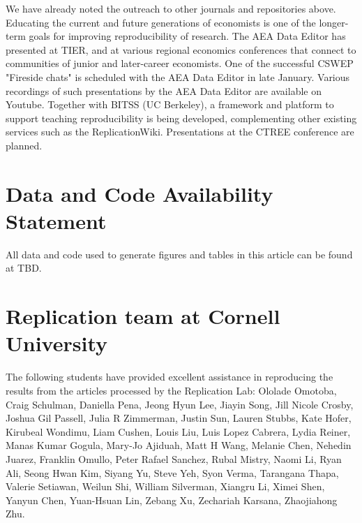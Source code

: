 \documentclass[PP]{AEA}
\begin{document}
We have already noted the outreach to other journals and repositories above. Educating the current and future generations of economists is one of the longer-term goals for improving reproducibility of research. The AEA Data Editor has presented at TIER, and at various regional economics conferences that connect to communities of junior and later-career economists. One of the successful CSWEP "Fireside chats" is scheduled with the AEA Data Editor in late January. Various recordings of such presentations by the AEA Data Editor are available on Youtube. Together with BITSS (UC Berkeley), a framework and platform to support teaching reproducibility is being developed, complementing other existing services such as the ReplicationWiki. Presentations at the CTREE conference are planned. 

\section{Data and Code Availability Statement}
\label{sec:dcas}

All data and code used to generate figures and tables in this article can be found at TBD.

\FloatBarrier
%
%



\appendix

%

\section{Replication team at Cornell University}
\label{app:replicators}

The following students have provided excellent assistance in reproducing the results from the \jiramcs{} articles processed by the Replication Lab:
%
%
Ololade Omotoba,
Craig  Schulman,
Daniella Pena,
Jeong Hyun Lee,
Jiayin Song,
Jill Nicole Crosby,
Joshua Gil Passell,
Julia R Zimmerman,
Justin Sun,
Lauren  Stubbs,
Kate  Hofer,
Kirubeal  Wondimu,
Liam Cushen,
Louis Liu,
Luis  Lopez Cabrera,
Lydia Reiner,
Manas Kumar Gogula,
Mary-Jo  Ajiduah,
Matt H Wang,
Melanie Chen,
Nehedin  Juarez,
Franklin Omullo,
Peter Rafael Sanchez,
Rubal Mistry,
Naomi  Li,
Ryan Ali,
Seong Hwan Kim,
Siyang Yu,
Steve Yeh,
Syon Verma,
Tarangana Thapa,
Valerie  Setiawan,
Weilun Shi,
William  Silverman,
Xiangru Li,
Ximei Shen,
Yanyun Chen,
Yuan-Hsuan Lin,
Zebang Xu,
Zechariah  Karsana,
Zhaojiahong Zhu.
\end{document}
